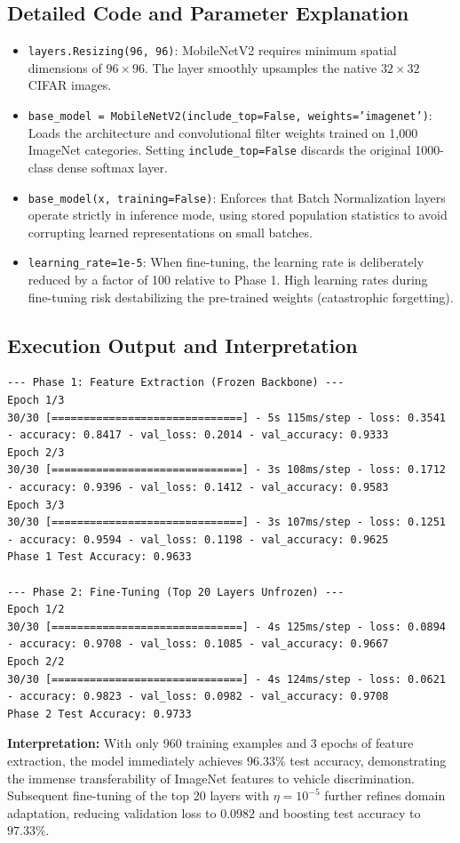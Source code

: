 \documentclass[12pt,a4paper]{article}
\begin{document}
\subsection{Detailed Code and Parameter Explanation}
\begin{itemize}[leftmargin=*]
\item \texttt{layers.Resizing(96, 96)}: MobileNetV2 requires minimum spatial dimensions of $96 \times 96$. The layer smoothly upsamples the native $32 \times 32$ CIFAR images.
\item \texttt{base\_model = MobileNetV2(include\_top=False, weights='imagenet')}: Loads the architecture and convolutional filter weights trained on 1,000 ImageNet categories. Setting \texttt{include\_top=False} discards the original 1000-class dense softmax layer.
\item \texttt{base\_model(x, training=False)}: Enforces that Batch Normalization layers operate strictly in inference mode, using stored population statistics to avoid corrupting learned representations on small batches.
\item \texttt{learning\_rate=1e-5}: When fine-tuning, the learning rate is deliberately reduced by a factor of 100 relative to Phase 1. High learning rates during fine-tuning risk destabilizing the pre-trained weights (catastrophic forgetting).
\end{itemize}

\subsection{Execution Output and Interpretation}
\begin{verbatim}
--- Phase 1: Feature Extraction (Frozen Backbone) ---
Epoch 1/3
30/30 [==============================] - 5s 115ms/step - loss: 0.3541 - accuracy: 0.8417 - val_loss: 0.2014 - val_accuracy: 0.9333
Epoch 2/3
30/30 [==============================] - 3s 108ms/step - loss: 0.1712 - accuracy: 0.9396 - val_loss: 0.1412 - val_accuracy: 0.9583
Epoch 3/3
30/30 [==============================] - 3s 107ms/step - loss: 0.1251 - accuracy: 0.9594 - val_loss: 0.1198 - val_accuracy: 0.9625
Phase 1 Test Accuracy: 0.9633

--- Phase 2: Fine-Tuning (Top 20 Layers Unfrozen) ---
Epoch 1/2
30/30 [==============================] - 4s 125ms/step - loss: 0.0894 - accuracy: 0.9708 - val_loss: 0.1085 - val_accuracy: 0.9667
Epoch 2/2
30/30 [==============================] - 4s 124ms/step - loss: 0.0621 - accuracy: 0.9823 - val_loss: 0.0982 - val_accuracy: 0.9708
Phase 2 Test Accuracy: 0.9733
\end{verbatim}

\textbf{Interpretation:}
With only 960 training examples and 3 epochs of feature extraction, the model immediately achieves $96.33\%$ test accuracy, demonstrating the immense transferability of ImageNet features to vehicle discrimination. Subsequent fine-tuning of the top 20 layers with $\eta=10^{-5}$ further refines domain adaptation, reducing validation loss to $0.0982$ and boosting test accuracy to $97.33\%$.
\end{document}
